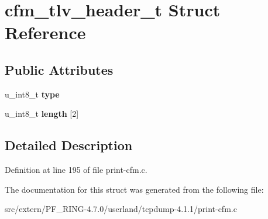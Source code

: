 \hypertarget{structcfm__tlv__header__t}{
\section{cfm\_\-tlv\_\-header\_\-t Struct Reference}
\label{structcfm__tlv__header__t}
}
\subsection*{Public Attributes}
\begin{DoxyCompactItemize}
\item 
\hypertarget{structcfm__tlv__header__t_ad85ca37b14af9caec3c469ac3789a100}{
u\_\-int8\_\-t {\bfseries type}}
\label{structcfm__tlv__header__t_ad85ca37b14af9caec3c469ac3789a100}

\item 
\hypertarget{structcfm__tlv__header__t_a38576de253bdce29ba90c681572711de}{
u\_\-int8\_\-t {\bfseries length} \mbox{[}2\mbox{]}}
\label{structcfm__tlv__header__t_a38576de253bdce29ba90c681572711de}

\end{DoxyCompactItemize}


\subsection{Detailed Description}


Definition at line 195 of file print-\/cfm.c.



The documentation for this struct was generated from the following file:\begin{DoxyCompactItemize}
\item 
src/extern/PF\_\-RING-\/4.7.0/userland/tcpdump-\/4.1.1/print-\/cfm.c\end{DoxyCompactItemize}
